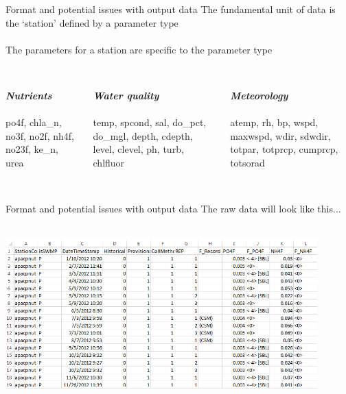 \documentclass[xcolor=svgnames]{beamer}\usepackage[]{graphicx}\usepackage[]{color}
\newcommand{\Bigtxt}[1]{\textbf{\textit{#1}}}
\begin{document}
\begin{frame}{Format and potential issues with output data}
\onslide<+->
The fundamental unit of data is the `station' defined by a parameter type \\~\\
The parameters for a station are specific to the parameter type \\~\\
\onslide<+->
\begin{columns}[t]
\begin{column}{0.3\textwidth}
\Bigtxt{Nutrients} \\~\\
po4f, chla\_n, no3f, no2f, nh4f, no23f, ke\_n, urea
\end{column}
\begin{column}{0.3\textwidth}
\Bigtxt{Water quality} \\~\\
temp, spcond, sal, do\_pct, do\_mgl, depth, cdepth, level, clevel, ph, turb, chlfluor
\end{column}
\begin{column}{0.3\textwidth}
\Bigtxt{Meteorology} \\~\\
atemp, rh, bp, wspd, maxwspd, wdir, sdwdir, totpar, totprcp, cumprcp, totsorad \\~\\
\end{column}
\end{columns}
\end{frame}

\begin{frame}{Format and potential issues with output data}
The raw data will look like this...\\~\\
\centerline{\includegraphics[width = 0.9\textwidth]{imgs/qaqc_ex.png}}
\end{frame}
\end{document}
